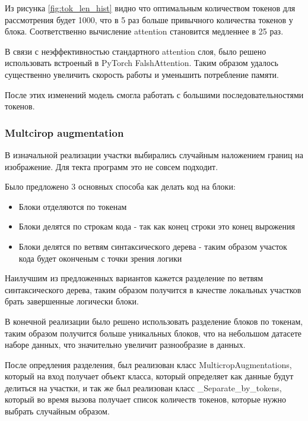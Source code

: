 \documentclass[../part_2.tex]{subfiles}
\begin{document}
    \par Из рисунка \ref{fig:tok_len_hist} видно что оптимальным количеством токенов для рассмотрения будет 1000, что в 5 раз больше привычного количества токенов у блока. Соответственно вычисление attention становится медленнее в 25 раз.
    \par В связи с неэффективностью стандартного attention слоя, было решено использовать встроеный в PyTorch FalshAttention\cite{dao2022flashattentionfastmemoryefficientexact}. Таким образом удалось существенно увеличить скорость работы и уменьшить потребление памяти.
    \par После этих изменений модель смогла работать с большими последовательностями токенов.

    \subsubsection{Multcirop augmentation}
    \par В изначальной реализации участки выбирались случайным наложением границ на изображение. Для текта программ это не совсем подходит.
    \par Было предложено 3 основных способа как делать код на блоки:
    \begin{itemize}
        \item Блоки отделяются по токенам
        \item Блоки делятся по строкам кода - так как конец строки это конец вырожения
        \item Блоки делятся по ветвям синтаксического дерева - таким образом участок кода будет оконченым с точки зрения логики
    \end{itemize}
    \par Наилучшим из предложенных вариантов кажется разделение по ветвям синтаксического дерева, таким образом получится в качестве локальных участков брать завершенные логически блоки.
    \par В конечной реализации было решено использовать разделение блоков по токенам, таким образом получится больше уникальных блоков, что на небольшом датасете наборе данных, что значительно увеличит разнообразие в данных.
    \par После опредления разделения, был реализован класс MulticropAugmentations, который на вход получает объект класса, который определяет как данные будут делиться на участки, и так же был реализован класс \_Separate\_by\_tokens, который во время вызова получает список количеств токенов, которые нужно выбрать случайным образом.
\end{document}
